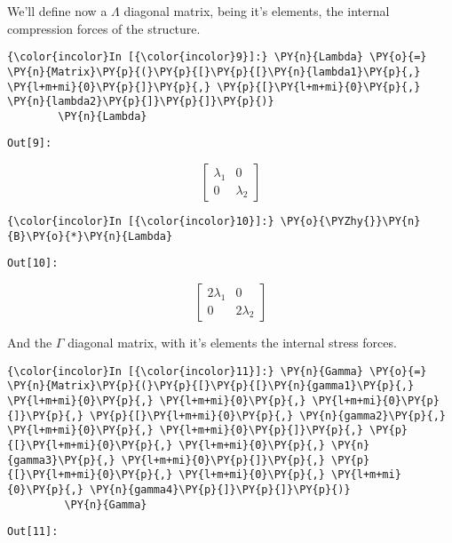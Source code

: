     We'll define now a \(\Lambda\) diagonal matrix, being it's elements, the
internal compression forces of the structure.

    \begin{Verbatim}[commandchars=\\\{\}]
{\color{incolor}In [{\color{incolor}9}]:} \PY{n}{Lambda} \PY{o}{=} \PY{n}{Matrix}\PY{p}{(}\PY{p}{[}\PY{p}{[}\PY{n}{lambda1}\PY{p}{,} \PY{l+m+mi}{0}\PY{p}{]}\PY{p}{,} \PY{p}{[}\PY{l+m+mi}{0}\PY{p}{,} \PY{n}{lambda2}\PY{p}{]}\PY{p}{]}\PY{p}{)}
        \PY{n}{Lambda}
\end{Verbatim}
\texttt{\color{outcolor}Out[{\color{outcolor}9}]:}


        \begin{equation*}
        \left[\begin{matrix}\lambda_{1} & 0\\0 & \lambda_{2}\end{matrix}\right]
        \end{equation*}



    \begin{Verbatim}[commandchars=\\\{\}]
{\color{incolor}In [{\color{incolor}10}]:} \PY{o}{\PYZhy{}}\PY{n}{B}\PY{o}{*}\PY{n}{Lambda}
\end{Verbatim}
\texttt{\color{outcolor}Out[{\color{outcolor}10}]:}


        \begin{equation*}
        \left[\begin{matrix}2 \lambda_{1} & 0\\0 & 2 \lambda_{2}\end{matrix}\right]
        \end{equation*}



    And the \(\Gamma\) diagonal matrix, with it's elements the internal
stress forces.

    \begin{Verbatim}[commandchars=\\\{\}]
{\color{incolor}In [{\color{incolor}11}]:} \PY{n}{Gamma} \PY{o}{=} \PY{n}{Matrix}\PY{p}{(}\PY{p}{[}\PY{p}{[}\PY{n}{gamma1}\PY{p}{,} \PY{l+m+mi}{0}\PY{p}{,} \PY{l+m+mi}{0}\PY{p}{,} \PY{l+m+mi}{0}\PY{p}{]}\PY{p}{,} \PY{p}{[}\PY{l+m+mi}{0}\PY{p}{,} \PY{n}{gamma2}\PY{p}{,} \PY{l+m+mi}{0}\PY{p}{,} \PY{l+m+mi}{0}\PY{p}{]}\PY{p}{,} \PY{p}{[}\PY{l+m+mi}{0}\PY{p}{,} \PY{l+m+mi}{0}\PY{p}{,} \PY{n}{gamma3}\PY{p}{,} \PY{l+m+mi}{0}\PY{p}{]}\PY{p}{,} \PY{p}{[}\PY{l+m+mi}{0}\PY{p}{,} \PY{l+m+mi}{0}\PY{p}{,} \PY{l+m+mi}{0}\PY{p}{,} \PY{n}{gamma4}\PY{p}{]}\PY{p}{]}\PY{p}{)}
         \PY{n}{Gamma}
\end{Verbatim}
\texttt{\color{outcolor}Out[{\color{outcolor}11}]:}


